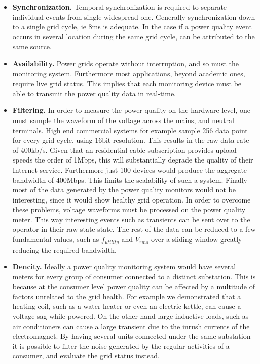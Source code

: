 \begin{itemize}
\item \textbf{Synchronization.} Temporal synchronization is required to separate individual events from single widespread one. Generally synchronization down to a single grid cycle, ie 8ms is
adequate. In the case if a power quality event occurs in several location during the same grid cycle, can be attributed to the same source.
\item \textbf{Availability.} Power grids operate without interruption, and so must the monitoring system. Furthermore most applications, beyond academic ones, require live grid status.
This implies that each monitoring device must be able to transmit the power quality data in real-time. 
\item \textbf{Filtering.} In order to measure the power quality  on the hardware level, one must sample the waveform of the voltage across the mains, and neutral terminals.
High end commercial systems for example sample 256 data point for every grid cycle, using 16bit resolution. This results in the raw data rate of 400kb/s. Given that an residential cable 
subscription provides upload speeds the order of 1Mbps, this will substantially degrade the quality of their Internet service. Furthermore just 100 devices would produce the aggregate bandwidth
of 400Mbps. This limits the scalability of such a system. Finally most of the data generated by the power quality monitors would not be interesting, since it would show healthy grid operation.
In order to overcome these problems, voltage waveforms must be processed on the power quality meter. This way interesting events such as transients can be sent over to the operator in their
raw state state. The rest of the data can be reduced to a few fundamental values, such as $f_{utility}$ and $V_{rms}$ over a sliding window greatly reducing the required bandwidth.
\item \textbf{Dencity.} Ideally a power quality monitoring system would have several meters for every group of consumer connected to a distinct
substation. This is because at the consumer level power quality can be affected by a multitude of factors unrelated to the grid health. For example we demonstrated that 
a heating coil, such as a water heater or even an electric kettle, can cause a voltage sag while powered. On the other hand large inductive loads, such as air conditioners 
can cause a large transient due to the inrush currents of the electromagnet. By having several units connected under the same substation it is possible to filter the noise generated
by the regular activities of a consumer, and evaluate the grid status instead.

\end{itemize}

